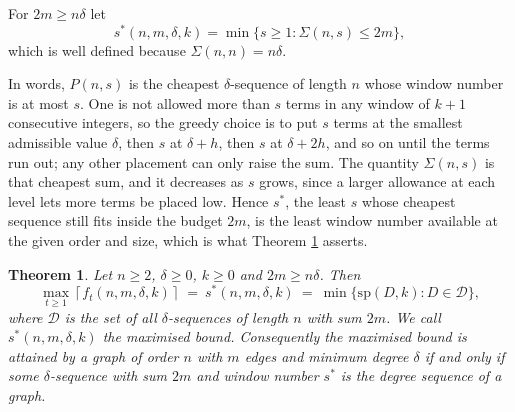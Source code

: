 \documentclass[10pt,a4paper]{article}
\newtheorem{theorem}{Theorem}
\begin{document}
For $2m\geq n\delta $ let
\[
s^{\ast }(n,m,\delta ,k)=\min \{s\geq 1:\Sigma (n,s)\leq 2m\},
\]
which is well defined because $\Sigma (n,n)=n\delta $.

In words, $P(n,s)$ is the cheapest $\delta $-sequence of length $n$ whose window
number is at most $s$. One is not allowed more than $s$ terms in any window of
$k+1$ consecutive integers, so the greedy choice is to put $s$ terms at the
smallest admissible value $\delta $, then $s$ at $\delta +h$, then $s$ at
$\delta +2h$, and so on until the terms run out; any other placement can only
raise the sum. The quantity $\Sigma (n,s)$ is that cheapest sum, and it
decreases as $s$ grows, since a larger allowance at each level lets more terms
be placed low. Hence $s^{\ast }$, the least $s$ whose cheapest sequence still
fits inside the budget $2m$, is the least window number available at the given
order and size, which is what Theorem \ref{Tm_sequence} asserts.



\begin{theorem}
\label{Tm_sequence}Let $n\geq 2$, $\delta \geq 0$, $k\geq 0$ and $2m\geq n\delta $. Then
\[
\max_{t\geq 1}\left\lceil f_{t}(n,m,\delta ,k)\right\rceil \ =\ s^{\ast }(n,m,\delta ,k)\ =\ \min
\{\mathrm{sp}(D,k):D\in \mathcal{D}\},
\]
where $\mathcal{D}$ is the set of all $\delta $-sequences of length $n$ with sum $2m$. We call
$s^{\ast }(n,m,\delta ,k)$ the \emph{maximised bound}. Consequently the maximised bound is attained by a graph of order
$n$ with $m$ edges and minimum degree $\delta $ if and only if some $\delta $-sequence with sum
$2m$ and window number $s^{\ast }$ is the degree sequence of a graph.
\end{theorem}
\end{document}
